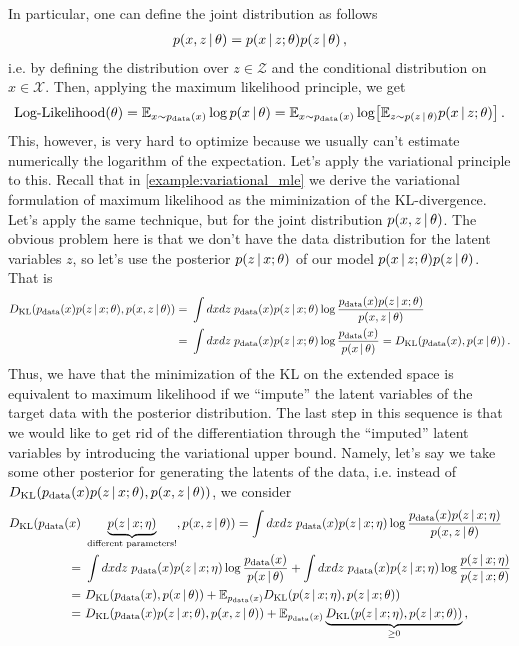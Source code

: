 In particular, one can define the joint distribution as follows
\begin{align}
    p(x,z\,|\, \theta) = p(x\,|\, z;\theta)p(z\,|\, \theta)\,,
\end{align}
i.e. by defining the distribution over $z \in \mathcal{Z}$ and the conditional distribution on $x \in \mathcal{X}$.
Then, applying the maximum likelihood principle, we get
\begin{align}
    \text{Log-Likelihood}(\theta) = \mean_{x\sim p_{\text{data}}(x)}\log p(x\cond\theta) = \mean_{x\sim p_{\text{data}}(x)}\log \left[\mean_{z \sim p(z\cond\theta)}p(x\cond z;\theta)\right]\,.
\end{align}
This, however, is very hard to optimize because we usually can't estimate numerically the logarithm of the expectation.
Let's apply the variational principle to this.
Recall that in \cref{example:variational_mle} we derive the variational formulation of maximum likelihood as the miminization of the KL-divergence.
Let's apply the same technique, but for the joint distribution $p(x,z\,|\, \theta)$.
The obvious problem here is that we don't have the data distribution for the latent variables $z$, so let's use the posterior $p(z\,|\, x;\theta)$ of our model $p(x\,|\, z;\theta)p(z\,|\, \theta)$.
That is
\begin{align}
    D_{\mathrm{KL}}(p_{\text{data}}(x)p(z\,|\, x;\theta), p(x,z\,|\, \theta)) =~& \int dxdz\;p_{\text{data}}(x)p(z\,|\, x;\theta) \log\frac{p_{\text{data}}(x)p(z\,|\, x;\theta)}{p(x,z\,|\, \theta)}\\
    =~&  \int dxdz\;p_{\text{data}}(x)p(z\,|\, x;\theta) \log\frac{p_{\text{data}}(x)}{p(x\,|\, \theta)} = D_{\mathrm{KL}}(p_{\text{data}}(x),p(x\,|\, \theta))\,.
    \label{eq:variational_mle_extended}
\end{align}
Thus, we have that the minimization of the KL on the extended space is equivalent to maximum likelihood if we ``impute'' the latent variables of the target data with the posterior distribution.
The last step in this sequence is that we would like to get rid of the differentiation through the ``imputed'' latent variables by introducing the variational upper bound.
Namely, let's say we take some other posterior for generating the latents of the data, i.e. instead of $D_{\mathrm{KL}}(p_{\text{data}}(x)p(z\,|\, x;\theta), p(x,z\,|\, \theta))$, we consider 
\begin{align}
    D_{\mathrm{KL}}(p_{\text{data}}(x)~&\underbrace{p(z\,|\, x;\eta)}_{\text{different parameters!}}, p(x,z\,|\, \theta)) = \int dxdz\;p_{\text{data}}(x)p(z\,|\, x;\eta) \log \frac{p_{\text{data}}(x)p(z\,|\, x;\eta)}{p(x,z\,|\, \theta)}\\
    =~& \int dxdz\;p_{\text{data}}(x)p(z\,|\, x;\eta) \log \frac{p_{\text{data}}(x)}{p(x\,|\, \theta)} + \int dxdz\;p_{\text{data}}(x)p(z\,|\, x;\eta) \log \frac{p(z\,|\, x;\eta)}{p(z\,|\, x;\theta)}\\
    =~& D_{\mathrm{KL}}(p_{\text{data}}(x),p(x\,|\, \theta)) + \mathbb{E}_{p_{\text{data}}(x)}D_{\mathrm{KL}}(p(z\,|\, x;\eta),p(z\,|\, x;\theta))\\
    =~& D_{\mathrm{KL}}(p_{\text{data}}(x)p(z\,|\, x;\theta), p(x,z\,|\, \theta)) + \mathbb{E}_{p_{\text{data}}(x)}\underbrace{D_{\mathrm{KL}}(p(z\,|\, x;\eta),p(z\,|\, x;\theta))}_{\geq 0}\,,
\end{align}
